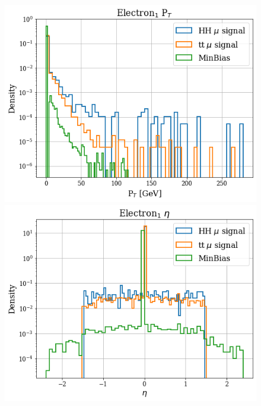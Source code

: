 \documentclass[../main.tex]{subfiles}
\begin{document}
\begin{figure}[!ht] 
  \begin{minipage}[b]{0.33\linewidth}
    \centering
    \includegraphics[width=1\linewidth]{Chapters/Plots/Hist_1mu_electron1_Et.png}
  \end{minipage}%
  \begin{minipage}[b]{0.33\linewidth}
    \centering
    \includegraphics[width=1\linewidth]{Chapters/Plots/Hist_1mu_electron1_Eta.png}
  \end{minipage} %
  \begin{minipage}[b]{0.33\linewidth}

\end{minipage}
\end{figure}
\end{document}
